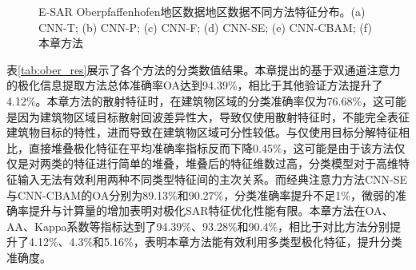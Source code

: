 \begin{figure}[ht!]

    \caption{E-SAR Oberpfaffenhofen地区数据地区数据不同方法特征分布。(a) CNN-T; (b) CNN-P; (c) CNN-F; (d) CNN-SE; (e) CNN-CBAM; (f) 本章方法}
    \label{fig:ober-tSNE}
\end{figure}

表\ref{tab:ober_res}展示了各个方法的分类数值结果。本章提出的基于双通道注意力的极化信息提取方法总体准确率OA达到94.39\%，相比于其他验证方法提升了4.12\%。本章方法的散射特征时，在建筑物区域的分类准确率仅为76.68\%，这可能是因为建筑物区域目标散射回波差异性大，导致仅使用散射特征时，不能完全表征建筑物目标的特性，进而导致在建筑物区域可分性较低。与仅使用目标分解特征相比，直接堆叠极化特征在平均准确率指标反而下降0.45\%，这可能是由于该方法仅仅是对两类的特征进行简单的堆叠，堆叠后的特征维数过高，分类模型对于高维特征输入无法有效利用两种不同类型特征间的主次关系。而经典注意力方法CNN-SE与CNN-CBAM的OA分别为89.13\%和90.27\%，分类准确率提升不足1\%，微弱的准确率提升与计算量的增加表明对极化SAR特征优化性能有限。本章方法在OA、AA、Kappa系数等指标达到了94.39\%、93.28\%和90.4\%，相比于对比方法分别提升了4.12\%、4.3\%和5.16\%，表明本章方法能有效利用多类型极化特征，提升分类准确度。

